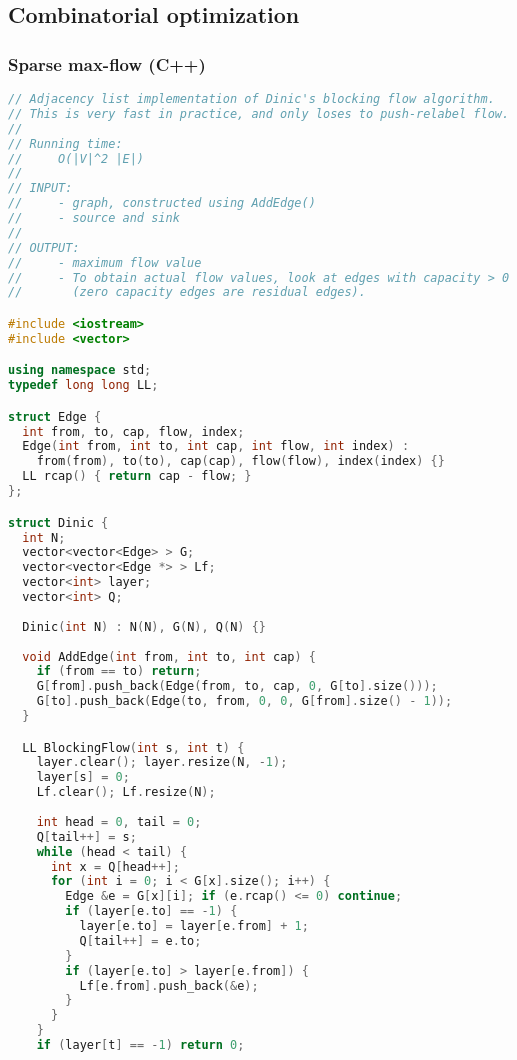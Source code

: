 \subsection{Combinatorial optimization}
\subsubsection{Sparse max-flow (C++)}
\begin{lstlisting}[language=C++]
// Adjacency list implementation of Dinic's blocking flow algorithm.
// This is very fast in practice, and only loses to push-relabel flow.
//
// Running time:
//     O(|V|^2 |E|)
//
// INPUT:
//     - graph, constructed using AddEdge()
//     - source and sink
//
// OUTPUT:
//     - maximum flow value
//     - To obtain actual flow values, look at edges with capacity > 0
//       (zero capacity edges are residual edges).

#include <iostream>
#include <vector>

using namespace std;
typedef long long LL;

struct Edge {
  int from, to, cap, flow, index;
  Edge(int from, int to, int cap, int flow, int index) :
    from(from), to(to), cap(cap), flow(flow), index(index) {}
  LL rcap() { return cap - flow; }
};

struct Dinic {
  int N;
  vector<vector<Edge> > G;
  vector<vector<Edge *> > Lf;
  vector<int> layer;
  vector<int> Q;
  
  Dinic(int N) : N(N), G(N), Q(N) {}
  
  void AddEdge(int from, int to, int cap) {
    if (from == to) return;
    G[from].push_back(Edge(from, to, cap, 0, G[to].size()));
    G[to].push_back(Edge(to, from, 0, 0, G[from].size() - 1));
  }

  LL BlockingFlow(int s, int t) {
    layer.clear(); layer.resize(N, -1);
    layer[s] = 0;
    Lf.clear(); Lf.resize(N);
    
    int head = 0, tail = 0;
    Q[tail++] = s;
    while (head < tail) {
      int x = Q[head++];
      for (int i = 0; i < G[x].size(); i++) {
        Edge &e = G[x][i]; if (e.rcap() <= 0) continue;
        if (layer[e.to] == -1) {
          layer[e.to] = layer[e.from] + 1;
          Q[tail++] = e.to;
        }
        if (layer[e.to] > layer[e.from]) {
          Lf[e.from].push_back(&e);
        }
      }
    }
    if (layer[t] == -1) return 0;


\end{lstlisting}
